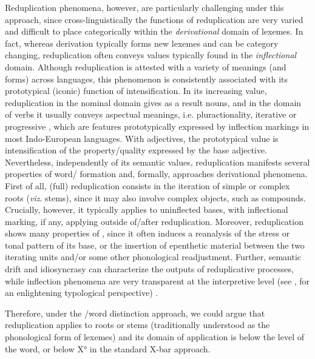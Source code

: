 \documentclass[output=paper]{langsci/langscibook}
\begin{document}
Reduplication phenomena, however, are particularly challenging under
this approach, since cross-linguistically the functions of reduplication
are very varied and difficult to place categorically within the
\emph{derivational} domain of lexemes. In fact, whereas derivation
typically forms new lexemes and can be category changing, reduplication
often conveys values typically found in the \emph{inflectional} domain.
Although reduplication is attested with a variety of meanings (and
forms) across languages, this phenomenon is consistently associated with
its prototypical (iconic) function of intensification. In its increasing
value, reduplication in the nominal domain gives as a result 
nouns, and in the domain of verbs it usually conveys aspectual meanings,
i.e. pluractionality, iterative or progressive , which are
features prototypically expressed by inflection markings in most
Indo-European languages. With adjectives, the prototypical value is
intensification of the property/quality expressed by the base adjective.
Nevertheless, independently of its semantic values, reduplication
manifests several properties of word/ formation and, formally,
approaches derivational phenomena. First of all, (full) reduplication
consists in the iteration of simple or complex roots (\emph{viz}.
stems), since it may also involve complex objects, such as compounds.
Crucially, however, it typically applies to uninflected bases, with
inflectional marking, if any, applying outside of/after reduplication.
Moreover, reduplication shows many properties of , since it
often induces a reanalysis of the stress or tonal pattern of its base,
or the insertion of epenthetic material between the two iterating units
and/or some other phonological readjustment. Further, semantic drift and
idiosyncrasy can characterize the outputs of reduplicative processes,
while inflection phenomena are very transparent at the interpretive
level %
(see %
\citealt{Forza2011}%
%
, for an enlightening typological perspective)
%
.

Therefore, under the /word distinction approach, we could argue
that reduplication applies to roots or stems (traditionally understood
as the phonological form of lexemes) and its domain of application is
below the level of the word, or below X° in the standard X-bar approach.
\end{document}
